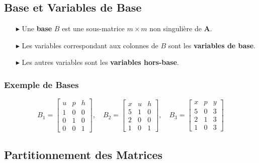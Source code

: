 \documentclass{report}
\begin{document}
\begin{multicols*}{2}
\subsection*{Base et Variables de Base}

\begin{itemize}
    \item[$\blacktriangleright$] Une \textbf{base} \( B \) est une sous-matrice \( m \times m \) non singulière de \( \mathbf{A} \).
    \item[$\blacktriangleright$] Les variables correspondant aux colonnes de \( B \) sont les \textbf{variables de base}.
    \item[$\blacktriangleright$] Les autres variables sont les \textbf{variables hors-base}.
\end{itemize}

\subsubsection*{Exemple de Bases}

\[
B_1 = 
\begin{bmatrix}
u & p & h \\
1 & 0 & 0 \\
0 & 1 & 0 \\
0 & 0 & 1
\end{bmatrix}, \quad
B_2 = 
\begin{bmatrix}
x & u & h \\
5 & 1 & 0 \\
2 & 0 & 0 \\
1 & 0 & 1
\end{bmatrix}, \quad
B_3 = 
\begin{bmatrix}
x & p & y \\
5 & 0 & 3 \\
2 & 1 & 3 \\
1 & 0 & 3
\end{bmatrix}
\]

\subsection*{Partitionnement des Matrices}


\end{multicols*}
\end{document}
